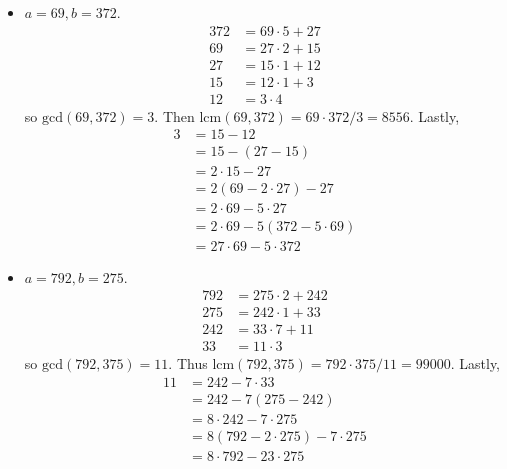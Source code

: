 \documentclass[12pt]{article}
\newenvironment{problem}[2][Exercise]{\begin{trivlist}
\item[\hskip \labelsep {\bfseries #1}\hskip \labelsep {\bfseries #2.}]}{\end{trivlist}}
\begin{document}
\begin{problem}{0.2.1}
\begin{itemize}
    \item $a=69,b=372$. 
    	\begin{equation*}\begin{split}
    		372 & = 69\cdot 5 + 27 \\
    		69 & = 27 \cdot 2 + 15 \\
    		27 & = 15 \cdot 1 + 12 \\
    		15 & = 12 \cdot 1 + 3 \\
    		12 & = 3 \cdot 4 
    	\end{split}\end{equation*} so $\text{gcd}\left(69,372\right)=3$. Then $\text{lcm}\left(69,372\right) = 69\cdot 372/3 = 8556$. Lastly, 
    	\begin{equation*}\begin{split}
    		3 & = 15 - 12 \\
    		& = 15 - \left(27-15\right) \\
    		& = 2\cdot 15 - 27 \\
    		& = 2\left(69 - 2\cdot 27\right) - 27 \\
    		& = 2\cdot 69 - 5\cdot 27 \\
    		& = 2\cdot 69 - 5\left(372-5\cdot 69\right) \\
    		& = 27\cdot 69 - 5\cdot 372 
    	\end{split}\end{equation*}
    
    \item $a=792,b=275$. 
    \begin{equation*}\begin{split}
    		792 & = 275 \cdot 2 + 242 \\
    		275 & = 242 \cdot 1 + 33 \\
    		242 & = 33 \cdot 7 + 11 \\
    		33 & = 11 \cdot 3 
    	\end{split}\end{equation*} so $\text{gcd}\left(792,375\right)=11$. Thus $\text{lcm}\left(792,375\right) = 792\cdot 375 / 11 = 99000$. Lastly,
    	\begin{equation*}\begin{split}
    		11 & = 242 - 7 \cdot 33 \\
    		& = 242 - 7\left( 275 - 242 \right) \\
    		& = 8 \cdot 242 - 7 \cdot 275 \\
    		& = 8\left(792-2\cdot 275\right) - 7\cdot 275 \\
    		& = 8 \cdot 792 - 23 \cdot 275
    	\end{split}\end{equation*}
    

\end{itemize}
\end{problem}
\end{document}
